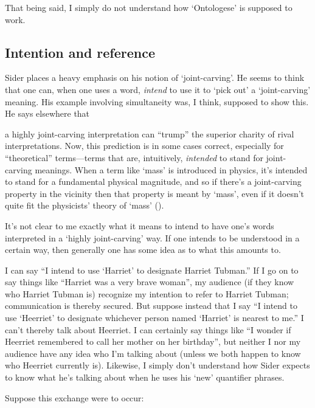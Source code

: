 \documentclass[11pt]{article}
\newenvironment{squote}{%
\begin{spacing}{1}
       	\begin{list}{}{%
\setlength{\labelwidth}{0pt}%
\rightmargin\leftmargin%
}
\item\relax
}{%
\end{list}%
\end{spacing}
}
\begin{document}
\begin{spacing}{1.25}
That being said, I simply do not understand how `Ontologese' is
supposed to work.

\subsection{Intention and reference}
Sider places a heavy emphasis on his notion of `joint-carving'.  He
seems to think that one can, when one uses a word, {\em intend} to use
it to `pick out' a `joint-carving' meaning.  His example involving
simultaneity was, I think, supposed to show this.  He says elsewhere
that

\begin{squote}
a highly joint-carving interpretation can ``trump'' the superior
charity of rival interpretations.  Now, this prediction is in some
cases correct, especially for ``theoretical'' terms---terms that are,
intuitively, {\em intended} to stand for joint-carving meanings.  When
a term like `mass' is introduced in physics, it's intended to stand
for a fundamental physical magnitude, and so if there's a
joint-carving property in the vicinity then that property is meant by
`mass', even if it doesn't quite fit the physicists' theory of `mass'
(\citeyear[32]{sider2011d}).
\end{squote}

It's not clear to me exactly what it means to intend to have one's
words interpreted in a `highly joint-carving' way.  If one intends to
be understood in a certain way, then generally one has some idea as to
what this amounts to.

I can say ``I intend to use `Harriet' to designate Harriet Tubman.''
If I go on to say things like ``Harriet was a very brave woman'', my
audience (if they know who Harriet Tubman is) recognize my intention
to refer to Harriet Tubman; communication is thereby secured.  But
suppose instead that I say ``I intend to use `Heerriet' to designate
whichever person named `Harriet' is nearest to me.''  I can't thereby
talk about Heerriet.  I can certainly say things like ``I wonder if
Heerriet remembered to call her mother on her birthday'', but neither
I nor my audience have any idea who I'm talking about (unless we both
happen to know who Heerriet currently is).  Likewise, I simply don't
understand how Sider expects to know what he's talking about when he
uses his `new' quantifier phrases.

Suppose this exchange were to occur:



\end{spacing}
\end{document}
